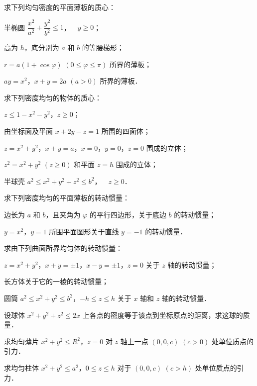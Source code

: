 \begin{xiti}
\item 求下列均匀密度的平面薄板的质心：
\begin{ziti}
\item 半椭圆 $\dfrac{x^{2}}{a^{2}}+\dfrac{y^{2}}{b^{2}}\leqslant 1$，$\quad y\geqslant 0$；
\item 高为 $h$，底分别为 $a$ 和 $b$ 的等腰梯形；
\item $r=a(1+\cos\varphi)$ $(0\leqslant\varphi\leqslant\pi)$ 所界的薄板；
\item $ay=x^{2}$，$x+y=2a$ $(a>0)$ 所界的薄板．
\end{ziti}
\item 求下列密度均匀的物体的质心：
\begin{ziti}
\item $z\leqslant 1-x^{2}-y^{2}$，$z\geqslant 0$；
\item 由坐标面及平面 $x+2y-z=1$ 所围的四面体；
\item $z=x^{2}+y^{2}$，$x+y=a$，$x=0$，$y=0$，$z=0$ 围成的立体；
\item $z^{2}=x^{2}+y^{2}$ $(z\geqslant 0)$ 和平面 $z=h$ 围成的立体；
\item 半球壳 $a^{2}\leqslant x^{2}+y^{2}+z^{2}\leqslant b^{2}$，$\quad z\geqslant 0$．
\end{ziti}
\item 求下列密度均匀的平面薄板的转动惯量：
\begin{ziti}
\item 边长为 $a$ 和 $b$，且夹角为 $\varphi$ 的平行四边形，关于底边 $b$ 的转动惯量；
\item $y=x^{2}$，$y=1$ 所围平面图形关于直线 $y=-1$ 的转动惯量．
\end{ziti}
\item 求由下列曲面所界均匀体的转动惯量：
\begin{ziti}
\item $z=x^{2}+y^{2}$，$x+y=\pm 1$，$x-y=\pm 1$，$z=0$ 关于 $z$ 轴的转动惯量；
\item 长方体关于它的一棱的转动惯量；
\item 圆筒 $a^{2}\leqslant x^{2}+y^{2}\leqslant b^{2}$，$-h\leqslant z\leqslant h$ 关于 $x$ 轴和 $z$ 轴的转动惯量．
\end{ziti}
\item 设球体 $x^{2}+y^{2}+z^{2}\leqslant 2x$ 上各点的密度等于该点到坐标原点的距离，求这球的质量．
\item 求均匀薄片 $x^{2}+y^{2}\leqslant R^{2}$，$z=0$ 对 $z$ 轴上一点 $(0,0,c)$ $(c>0)$ 处单位质点的引力．
\item 求均匀柱体 $x^{2}+y^{2}\leqslant a^{2}$，$0\leqslant z\leqslant h$ 对于 $(0,0,c)$ $(c>h)$ 处单位质点的引力．
\end{xiti}


